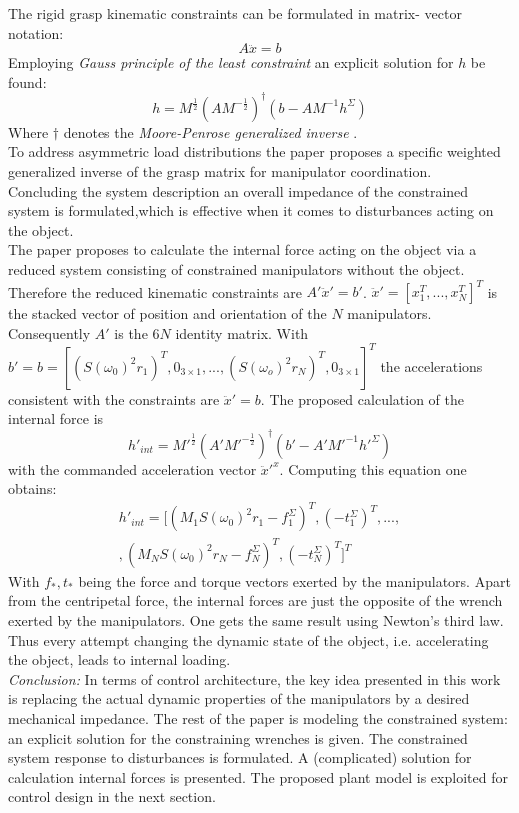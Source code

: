 \documentclass[conference]{IEEEtran}
\begin{document}
The rigid grasp kinematic constraints can be formulated in matrix- vector notation:
\begin{equation}
A \ddot{x} = b
\end{equation}
Employing \textit{Gauss principle of the least constraint} an explicit solution for $ h $ be found: 
\begin{equation}
h = M^{\frac{1}{2}}(AM^{-\frac{1}{2}})^{\dagger}(b - AM^{-1}h^\Sigma)
\end{equation}
Where $ \dagger $ denotes the \textit{Moore-Penrose generalized inverse} \cite{UdwadiaKalaba1992}.\\
To address asymmetric load distributions the paper proposes a specific weighted generalized inverse of the grasp matrix for manipulator coordination.\\
Concluding the system description an overall impedance of the constrained system is formulated,which is effective when it comes to disturbances acting on the object. \\
The paper proposes to calculate the internal force acting on the object via a reduced system consisting of constrained manipulators without the object. Therefore the reduced kinematic constraints are $ A'\ddot{x}' = b' $. $ \ddot{x}' = [x_1^T,...,x_N^T]^T $ is the stacked vector of position and orientation of the $ N $ manipulators. Consequently $ A' $ is the $ 6N $ identity matrix. With $ b' = b = [(S(\omega_0)^2r_1)^T,0_{3\times1},...,(S(\omega_o)^2r_N)^T,0_{3\times1} ]^T $ the accelerations consistent with the constraints are $ \ddot{x}' = b $. The proposed calculation of the internal force is
\begin{equation}
h'_{int} = M'^{\frac{1}{2}}(A'M'^{-\frac{1}{2}})^{\dagger}(b' - A'M'^{-1}h'^{\Sigma})
\end{equation}
with the commanded acceleration vector $ \ddot{x}'^x $. Computing this equation one obtains:
\begin{multline}
h'_{int} = [(M_1S(\omega_0)^2r_1 - f_1^\Sigma)^T,(-t_1^\Sigma)^T,...,\\,(M_NS(\omega_0)^2r_N - f_N^\Sigma)^T,(-t_N^\Sigma)^T]^T
\end{multline}
With $ f_*,t_* $ being the force and torque vectors exerted by the manipulators.
Apart from the centripetal force, the internal forces are just the opposite of the wrench exerted by the manipulators. One gets the same result using Newton's third law.
Thus every attempt changing the dynamic state of the object, i.e. accelerating the object, leads to internal loading. \\
\textit{Conclusion:} In terms of control architecture, the key idea presented in this work is replacing the actual dynamic properties of the manipulators by a desired mechanical impedance. The rest of the paper is modeling the constrained system: an explicit solution for the constraining wrenches is given. The constrained system response to disturbances is formulated. A (complicated) solution for calculation internal forces is presented. The proposed plant model is exploited for control design in the next section. 
\end{document}
